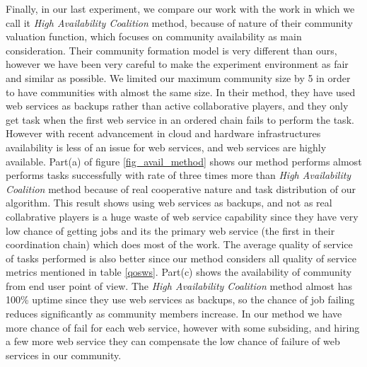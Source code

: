 \documentclass[10pt,journal,cspaper,compsoc]{IEEEtran}
\begin{document}
Finally, in our last experiment, we compare our work with the work in \cite{10.1109/TSC.2012.12} which we call it \emph{High Availability Coalition} method, because of nature of their community valuation function, which focuses on community availability as main consideration. Their community formation model is very different than ours, however we have been very careful to make the experiment environment as fair and similar as possible. We limited our maximum community size by 5 in order to have communities with almost the same size. In their method, they have used web services as backups rather than active collaborative players, and they only get task when the first web service in an ordered chain fails to perform the task. However with recent advancement in cloud and hardware infrastructures availability is less of an issue for web services, and web services are highly available. Part(a) of figure \ref{fig_avail_method} shows our method performs almost performs tasks successfully with rate of three times more than \emph{High Availability Coalition} method because of real cooperative nature and task distribution of our algorithm. This result shows using web services as backups, and not as real collabrative players is a huge waste of web service capability since they have very low chance of getting jobs and its the primary web service (the first in their coordination chain) which does most of the work. The average quality of service of tasks performed is also better since our method considers all quality of service metrics mentioned in table \ref{qosws}. Part(c) shows the availability of community from end user point of view. The \emph {High Availability Coalition} method almost has 100\% uptime since they use web services as backups, so the chance of job failing reduces significantly as community members increase. In our method we have more chance of fail for each web service, however with some subsiding, and hiring a few more web service they can compensate the low chance of failure of web services in our community.




\end{document}

